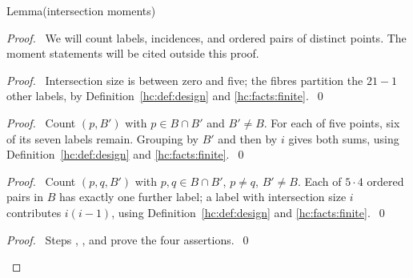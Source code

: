\begin{mergedproofsection}
\begin{namedresult}{Lemma}{(intersection moments)}\label{hc:lem:moments}
 \leavevmode\par
\end{namedresult}
\begin{proof}
 \pfsketch\ We will count labels, incidences, and ordered pairs of
 distinct points. The moment statements will be cited outside this proof.
 \begin{proof}\pf\ Intersection size is between zero and five;
  the fibres partition the $21-1$ other labels, by
  Definition~\ref{hc:def:design} and \ref{hc:facts:finite}.~\qed\end{proof}
 \begin{proof}\pf\ Count $(p,B')$ with $p\in B\cap B'$ and $B'\ne B$.
  For each of five points, six of its seven labels remain.
  Grouping by $B'$ and then by $i$ gives both sums, using
  Definition~\ref{hc:def:design} and \ref{hc:facts:finite}.~\qed\end{proof}
 \begin{proof}\pf\ Count $(p,q,B')$ with $p,q\in B\cap B'$, $p\ne q$,
  $B'\ne B$. Each of $5\cdot4$ ordered pairs in $B$ has exactly
  one further label; a label with intersection size $i$ contributes
  $i(i-1)$, using Definition~\ref{hc:def:design} and
  \ref{hc:facts:finite}.~\qed\end{proof}
 \qedstep
 \begin{proof}\pf\ Steps , ,
  and  prove the four assertions.~\qed\end{proof}
\end{proof}


\end{mergedproofsection}

